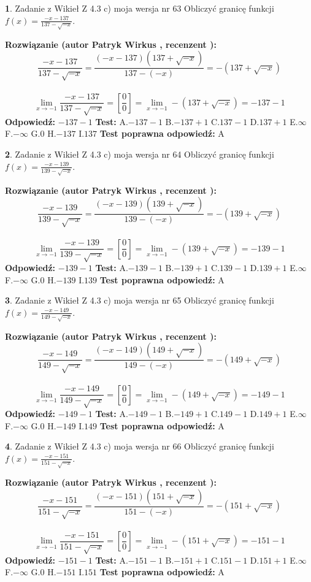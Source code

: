 \documentclass[12pt, a4paper]{article}
\theoremstyle{definition} %
\newtheorem{zad}{}
\newcommand{\zadStart}[1]{\begin{zad}#1\newline}
\newcommand{\zadStop}{\end{zad}}
\newcommand{\rozwStart}[2]{\noindent \textbf{Rozwiązanie (autor #1 , recenzent #2): }\newline}
\newcommand{\rozwStop}{\newline}
\newcommand{\odpStart}{\noindent \textbf{Odpowiedź:}\newline}
\newcommand{\odpStop}{\newline}
\newcommand{\testStart}{\noindent \textbf{Test:}\newline}
\newcommand{\testStop}{\newline}
\newcommand{\kluczStart}{\noindent \textbf{Test poprawna odpowiedź:}\newline}
\newcommand{\kluczStop}{\newline}
\begin{document}
\zadStart{Zadanie z Wikieł Z 4.3 c) moja wersja nr 63}
Obliczyć granicę funkcji $f(x)=\frac{-x-137}{137-\sqrt{-x}}$.
\zadStop
\rozwStart{Patryk Wirkus}{}
$$\frac{-x-137}{137-\sqrt{-x}}=\frac{(-x-137)(137+\sqrt{-x})}{137-(-x)}=-(137+\sqrt{-x})$$
\\
$$\lim\limits_{x\to-1}\frac{-x-137}{137-\sqrt{-x}}=[\frac{0}{0}]=\lim\limits_{x\to-1}-(137+\sqrt{-x}) =-137-1$$
\rozwStop
\odpStart
$-137-1$
\odpStop
\testStart
A.$-137-1$
B.$-137+1$
C.$137-1$
D.$137+1$
E.$\infty$
F.$-\infty$
G.$0$
H.$-137$
I.$137$
\testStop
\kluczStart
A
\kluczStop



\zadStart{Zadanie z Wikieł Z 4.3 c) moja wersja nr 64}
Obliczyć granicę funkcji $f(x)=\frac{-x-139}{139-\sqrt{-x}}$.
\zadStop
\rozwStart{Patryk Wirkus}{}
$$\frac{-x-139}{139-\sqrt{-x}}=\frac{(-x-139)(139+\sqrt{-x})}{139-(-x)}=-(139+\sqrt{-x})$$
\\
$$\lim\limits_{x\to-1}\frac{-x-139}{139-\sqrt{-x}}=[\frac{0}{0}]=\lim\limits_{x\to-1}-(139+\sqrt{-x}) =-139-1$$
\rozwStop
\odpStart
$-139-1$
\odpStop
\testStart
A.$-139-1$
B.$-139+1$
C.$139-1$
D.$139+1$
E.$\infty$
F.$-\infty$
G.$0$
H.$-139$
I.$139$
\testStop
\kluczStart
A
\kluczStop



\zadStart{Zadanie z Wikieł Z 4.3 c) moja wersja nr 65}
Obliczyć granicę funkcji $f(x)=\frac{-x-149}{149-\sqrt{-x}}$.
\zadStop
\rozwStart{Patryk Wirkus}{}
$$\frac{-x-149}{149-\sqrt{-x}}=\frac{(-x-149)(149+\sqrt{-x})}{149-(-x)}=-(149+\sqrt{-x})$$
\\
$$\lim\limits_{x\to-1}\frac{-x-149}{149-\sqrt{-x}}=[\frac{0}{0}]=\lim\limits_{x\to-1}-(149+\sqrt{-x}) =-149-1$$
\rozwStop
\odpStart
$-149-1$
\odpStop
\testStart
A.$-149-1$
B.$-149+1$
C.$149-1$
D.$149+1$
E.$\infty$
F.$-\infty$
G.$0$
H.$-149$
I.$149$
\testStop
\kluczStart
A
\kluczStop



\zadStart{Zadanie z Wikieł Z 4.3 c) moja wersja nr 66}
Obliczyć granicę funkcji $f(x)=\frac{-x-151}{151-\sqrt{-x}}$.
\zadStop
\rozwStart{Patryk Wirkus}{}
$$\frac{-x-151}{151-\sqrt{-x}}=\frac{(-x-151)(151+\sqrt{-x})}{151-(-x)}=-(151+\sqrt{-x})$$
\\
$$\lim\limits_{x\to-1}\frac{-x-151}{151-\sqrt{-x}}=[\frac{0}{0}]=\lim\limits_{x\to-1}-(151+\sqrt{-x}) =-151-1$$
\rozwStop
\odpStart
$-151-1$
\odpStop
\testStart
A.$-151-1$
B.$-151+1$
C.$151-1$
D.$151+1$
E.$\infty$
F.$-\infty$
G.$0$
H.$-151$
I.$151$
\testStop
\kluczStart
A
\kluczStop
\end{document}
